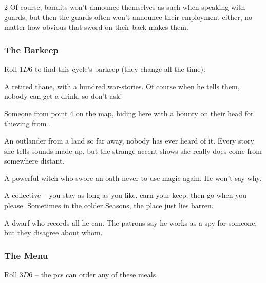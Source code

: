 \begin{multicols}{2}
Of course, bandits won't announce themselves as such when speaking with \glspl{guard}, but then the \glspl{guard} often won't announce their employment either, no matter how obvious that sword on their back makes them.

\subsubsection{The Barkeep}

Roll $1D6$ to find this \gls{cycle}'s barkeep (they change all the time):

\begin{dlist}
  \item
  A retired \gls{thane}, with a hundred war-stories.
  Of course when he tells them, nobody can get a drink, so don't ask!
  \item
  Someone from point 4 on the map, hiding here with a bounty on their head for thieving from .
  \item
  An outlander from a land so far away, nobody has ever heard of it.
  Every story she tells sounds made-up, but the strange accent shows she really does come from somewhere distant.
  \item
  A powerful \gls{witch} who swore an oath never to use magic again.
  He won't say why.
  \item
  A collective -- you stay as long as you like, earn your keep, then go
  when you please. Sometimes in the colder Seasons, the place just lies
  barren.
  \item
  A dwarf who records all he can.
  The patrons say he works as a spy for someone, but they disagree about whom.
\end{dlist}

\subsubsection{The Menu}

Roll $3D6$ -- the \glspl{pc} can order any of these meals.

\newcommand\menuItem[3][(\arabic{r12} \glspl{cp})]{%
  \item
  \textbf{#2:}
  #3
  \randomize%
  #1
}


\end{multicols}
